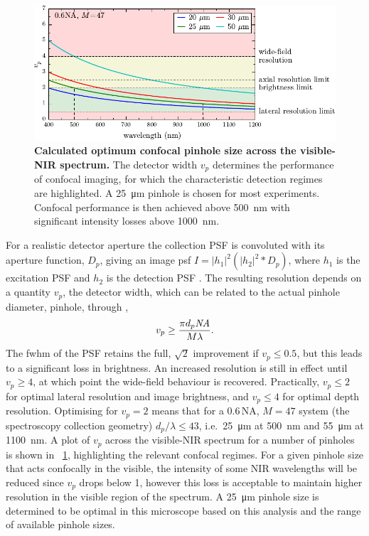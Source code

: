 \documentclass{article}
\begin{document}
\begin{figure}[bt]
\centering
\includegraphics{figures/confocal_pinhole_choice}
\caption[Calculated optimum confocal pinhole size across the visible-NIR spectrum]{\textbf{Calculated optimum confocal pinhole size across the visible-NIR spectrum.} The detector width $v_p$ determines the performance of confocal imaging, for which the characteristic detection regimes are highlighted. A \SI{25}{\micro\metre} pinhole is chosen for most experiments. Confocal performance is then achieved above \SI{500}{nm} with significant intensity losses above \SI{1000}{nm}.}
\label{fig:confocal_pinhole_choice}
\end{figure}

For a realistic detector aperture the collection PSF is convoluted with its aperture function, $D_p$, giving an image \gls{psf} $I=|h_1|^2(|h_2|^2 \ast D_p)$, where $h_1$ is the excitation PSF and $h_2$ is the detection PSF \cite{wilson1987size}. The resulting resolution depends on a quantity $v_p$, the detector width, which can be related to the actual pinhole diameter, \gls{pinhole}, through \cite{wilson1987size},
\begin{equation}
	v_p \geq \frac{\pi d_p \mathit{NA}}{M \lambda}.
\end{equation}
The \gls{fwhm} of the PSF retains the full, $\sqrt{2}$ improvement if $v_p\leq0.5$, but this leads to a significant loss in brightness. An increased resolution is still in effect until $v_p\geq4$, at which point the wide-field behaviour is recovered. Practically, $v_p\leq2$ for optimal lateral resolution and image brightness, and $v_p\leq4$ for optimal depth resolution. Optimising for $v_p=2$ means that for a 0.6\,NA, $M=47$ system (the spectroscopy collection geometry) $d_p/\lambda\leq43$, i.e.\ \SI{25}{\micro\metre} at \SI{500}{nm} and \SI{55}{\micro\metre} at \SI{1100}{nm}. A plot of $v_p$ across the visible-NIR spectrum for a number of pinholes is shown in \figurename~\ref{fig:confocal_pinhole_choice}, highlighting the relevant confocal regimes. For a given pinhole size that acts confocally in the visible, the intensity of some NIR wavelengths will be reduced since $v_p$ drops below 1, however this loss is acceptable to maintain higher resolution in the visible region of the spectrum. A \SI{25}{\micro\metre} pinhole size is determined to be optimal in this microscope based on this analysis and the range of available pinhole sizes.
\end{document}
